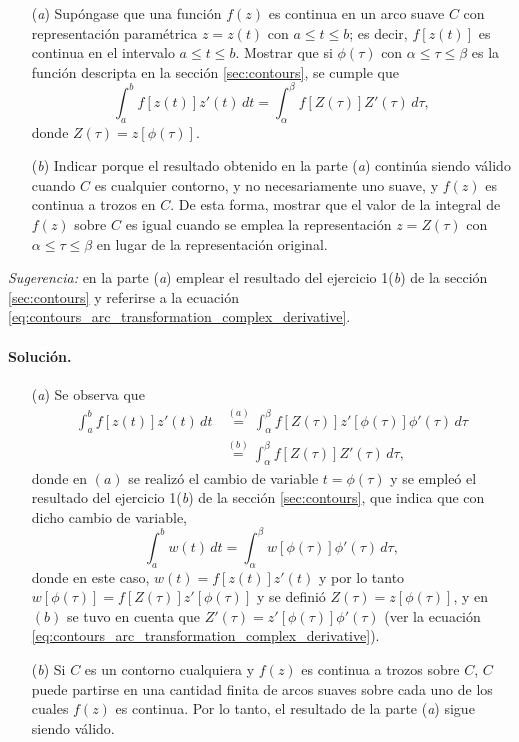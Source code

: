 \documentclass[a4paper]{report}
\begin{document}
\begin{enumerate}
 \item[(\textit{a})] Supóngase que una función \(f(z)\) es continua en un arco suave \(C\) con representación paramétrica \(z=z(t)\) con \(a\leq t\leq b\); es decir, \(f[z(t)]\) es continua en el intervalo \(a\leq t\leq b\). Mostrar que si \(\phi(\tau)\) con \(\alpha\leq\tau\leq\beta\) es la función descripta en la sección \ref{sec:contours}, se cumple que 
 \[
  \int_a^bf[z(t)]z'(t)\,dt=\int_\alpha^\beta f[Z(\tau)]Z'(\tau)\,d\tau,
 \]
 donde \(Z(\tau)=z[\phi(\tau)]\).
 \item[(\textit{b})] Indicar porque el resultado obtenido en la parte (\textit{a}) continúa siendo válido cuando \(C\) es cualquier contorno, y no necesariamente uno suave, y \(f(z)\) es continua a trozos en \(C\). De esta forma, mostrar que el valor de la integral de \(f(z)\) sobre \(C\) es igual cuando se emplea la representación \(z=Z(\tau)\) con \(\alpha\leq\tau\leq\beta\) en lugar de la representación original.
\end{enumerate}

\emph{Sugerencia:} en la parte (\textit{a}) emplear el resultado del ejercicio 1(\textit{b}) de la sección \ref{sec:contours} y referirse a la ecuación \ref{eq:contours_arc_transformation_complex_derivative}.

\paragraph{Solución.} 

\begin{enumerate}
 \item[(\textit{a})] Se observa que 
 \begin{align*}
  \int_a^bf[z(t)]z'(t)\,dt&\overset{(a)}{=}\int_\alpha^\beta f[Z(\tau)]z'[\phi(\tau)]\phi'(\tau)\,d\tau\\
   &\overset{(b)}{=}\int_\alpha^\beta f[Z(\tau)]Z'(\tau)\,d\tau,
 \end{align*}
 donde en \((a)\) se realizó el cambio de variable \(t=\phi(\tau)\) y se empleó el resultado del ejercicio 1(\textit{b}) de la sección \ref{sec:contours}, que indica que con dicho cambio de variable,
 \[
  \int_{a}^{b}w(t)\,dt=\int_\alpha^\beta w[\phi(\tau)]\phi'(\tau)\,d\tau,
 \]
 donde en este caso, \(w(t)=f[z(t)]z'(t)\) y por lo tanto \(w[\phi(\tau)]=f[Z(\tau)]z'[\phi(\tau)]\) y se definió \(Z(\tau)=z[\phi(\tau)]\), y en \((b)\) se tuvo en cuenta que \(Z'(\tau)=z'[\phi(\tau)]\phi'(\tau)\) (ver la ecuación \ref{eq:contours_arc_transformation_complex_derivative}).
 \item[(\textit{b})] Si \(C\) es un contorno cualquiera y \(f(z)\) es continua a trozos sobre \(C\), \(C\) puede partirse en una cantidad finita de arcos suaves sobre cada uno de los cuales \(f(z)\) es continua. Por lo tanto, el resultado de la parte (\textit{a}) sigue siendo válido.
\end{enumerate}
\end{document}

